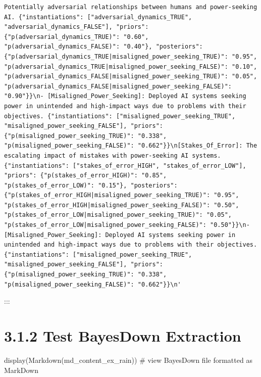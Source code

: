 \documentclass[
  11pt,
  letterpaper,
]{book}
\newenvironment{Shaded}{\begin{snugshade}}{\end{snugshade}}
\newcommand{\CommentTok}[1]{\textcolor[rgb]{0.37,0.37,0.37}{#1}}
\newcommand{\NormalTok}[1]{\textcolor[rgb]{0.00,0.23,0.31}{#1}}
\begin{document}
\begin{verbatim}
Potentially adversarial relationships between humans and power-seeking AI. {"instantiations": ["adversarial_dynamics_TRUE", "adversarial_dynamics_FALSE"], "priors": {"p(adversarial_dynamics_TRUE)": "0.60", "p(adversarial_dynamics_FALSE)": "0.40"}, "posteriors": {"p(adversarial_dynamics_TRUE|misaligned_power_seeking_TRUE)": "0.95", "p(adversarial_dynamics_TRUE|misaligned_power_seeking_FALSE)": "0.10", "p(adversarial_dynamics_FALSE|misaligned_power_seeking_TRUE)": "0.05", "p(adversarial_dynamics_FALSE|misaligned_power_seeking_FALSE)": "0.90"}}\n- [Misaligned_Power_Seeking]: Deployed AI systems seeking power in unintended and high-impact ways due to problems with their objectives. {"instantiations": ["misaligned_power_seeking_TRUE", "misaligned_power_seeking_FALSE"], "priors": {"p(misaligned_power_seeking_TRUE)": "0.338", "p(misaligned_power_seeking_FALSE)": "0.662"}}\n[Stakes_Of_Error]: The escalating impact of mistakes with power-seeking AI systems. {"instantiations": ["stakes_of_error_HIGH", "stakes_of_error_LOW"], "priors": {"p(stakes_of_error_HIGH)": "0.85", "p(stakes_of_error_LOW)": "0.15"}, "posteriors": {"p(stakes_of_error_HIGH|misaligned_power_seeking_TRUE)": "0.95", "p(stakes_of_error_HIGH|misaligned_power_seeking_FALSE)": "0.50", "p(stakes_of_error_LOW|misaligned_power_seeking_TRUE)": "0.05", "p(stakes_of_error_LOW|misaligned_power_seeking_FALSE)": "0.50"}}\n- [Misaligned_Power_Seeking]: Deployed AI systems seeking power in unintended and high-impact ways due to problems with their objectives. {"instantiations": ["misaligned_power_seeking_TRUE", "misaligned_power_seeking_FALSE"], "priors": {"p(misaligned_power_seeking_TRUE)": "0.338", "p(misaligned_power_seeking_FALSE)": "0.662"}}\n'
\end{verbatim}

:::

\section{3.1.2 Test BayesDown
Extraction}\label{test-bayesdown-extraction}

\begin{Shaded}
\begin{Highlighting}[]
\NormalTok{display(Markdown(md\_content\_ex\_rain)) }\CommentTok{\# view BayesDown file formatted as MarkDown}
\end{Highlighting}
\end{Shaded}
\end{document}
